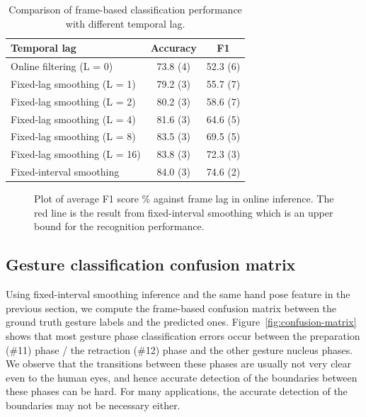 \documentclass{acm_proc_article-sp}
\begin{document}
\begin{table}[tb]
\begin{center}
\caption{Comparison of frame-based classification performance with different temporal lag.}
\label{tab:comp-inf}
\begin{tabular}{|l|c|c|}
\hline
\textbf{Temporal lag} & \textbf{Accuracy} & \textbf{F1}  \\
\hline
Online filtering (L = 0) & 73.8 (4) & 52.3 (6)\\
\hline
Fixed-lag smoothing (L = 1) & 79.2 (3) & 55.7 (7)  \\
\hline
Fixed-lag smoothing (L = 2) & 80.2 (3) & 58.6 (7) \\
\hline
Fixed-lag smoothing (L = 4) & 81.6 (3) & 64.6 (5) \\
\hline
Fixed-lag smoothing (L = 8) & 83.5 (3) & 69.5 (5) \\
\hline
Fixed-lag smoothing (L = 16) & 83.8 (3) & 72.3 (3) \\
\hline
Fixed-interval smoothing & 84.0 (3) & 74.6 (2)\\ 
\hline
\end{tabular}
\end{center}
\end{table}

\begin{figure}
\caption{Plot of average F1 score \% against frame
   lag in online inference. The red line is the result from fixed-interval
   smoothing which is an upper bound for the recognition performance.}
\label{fig:comp-inf}
\end{figure}

\subsection{Gesture classification confusion matrix}
Using fixed-interval smoothing inference and the same hand pose feature in the previous
section, we compute the frame-based confusion matrix
between the ground truth gesture labels and the predicted ones. Figure~\ref{fig:confusion-matrix} shows that most gesture phase classification errors
occur between the preparation (\#11) phase / the retraction (\#12) phase and the other gesture nucleus phases. We
observe that the transitions between these phases are usually
not very clear even to the human eyes, and hence accurate detection of the boundaries between these
phases can be hard. For many applications, the accurate detection of the boundaries may not be
necessary either.
\end{document}
